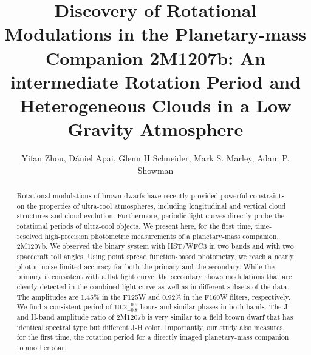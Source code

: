 \documentclass[apj]{emulateapj}
\begin{document}
\title{Discovery of Rotational Modulations in the Planetary-mass
  Companion 2M1207\lowercase{b}: An intermediate Rotation Period and Heterogeneous Clouds in a Low
  Gravity Atmosphere}
\author{Yifan Zhou, D\'aniel Apai,
  Glenn H Schneider,  Mark S. Marley,
  Adam P. Showman}


\begin{abstract}
  Rotational modulations of brown dwarfs have recently provided
  powerful constraints on the properties of ultra-cool atmospheres,
  including longitudinal and vertical cloud structures and cloud
  evolution. Furthermore, periodic light curves directly probe the
  rotational periods of ultra-cool objects.  We present here, for the
  first time, time-resolved high-precision photometric measurements of
  a planetary-mass companion, 2M1207b.  We observed the binary
  system with HST/WFC3 in two bands and with two spacecraft roll
  angles. Using point spread function-based photometry, we reach a
  nearly photon-noise limited accuracy for both the primary and the
  secondary. While the primary is consistent with a flat light curve,
  the secondary shows modulations that are clearly detected in the
  combined light curve as well as in different subsets of the data.
  The amplitudes are 1.45\% in the F125W and 0.92\% in the F160W
  filters, respectively. We find a consistent period of
  $10.2^{+0.9}_{-0.8}$ hours and
  similar phases in both bands. The J- and H-band amplitude ratio of
  2M1207b is very similar to a field brown dwarf that has identical
  spectral type but different J-H color.  Importantly, our study also
  measures, for the first time, the rotation period for a directly 
  imaged planetary-mass companion to another star.
\end{abstract}

\maketitle
%
\end{document}
